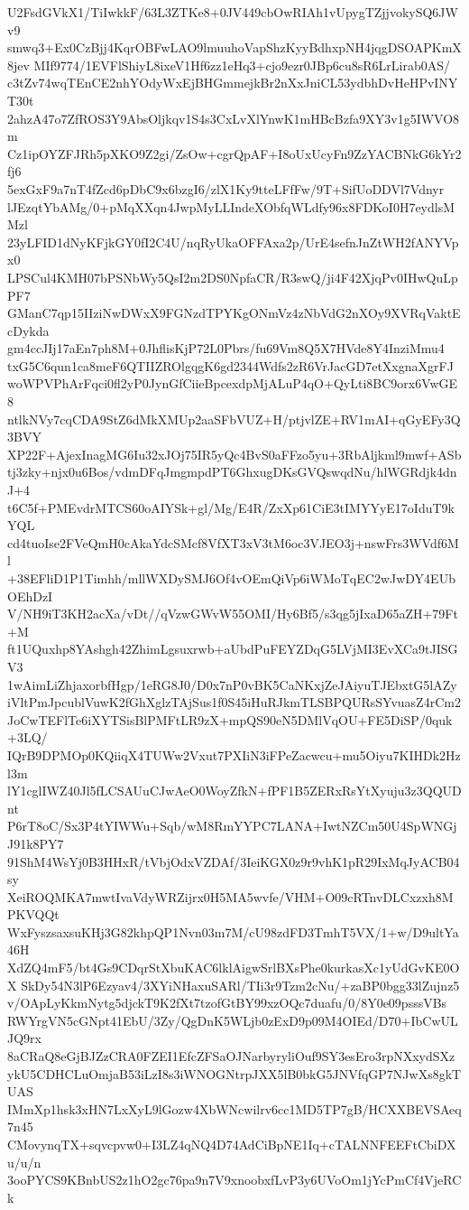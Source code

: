 U2FsdGVkX1/TiIwkkF/63L3ZTKe8+0JV449cbOwRIAh1vUpygTZjjvokySQ6JWv9
smwq3+Ex0CzBjj4KqrOBFwLAO9lmuuhoVapShzKyyBdhxpNH4jqgDSOAPKmX8jev
MIf9774/1EVFlShiyL8ixeV1Hf6zz1eHq3+cjo9ezr0JBp6cu8sR6LrLirab0AS/
c3tZv74wqTEnCE2nhYOdyWxEjBHGmmejkBr2nXxJniCL53ydbhDvHeHPvINYT30t
2ahzA47o7ZfROS3Y9AbsOljkqv1S4s3CxLvXlYnwK1mHBcBzfa9XY3v1g5IWVO8m
Cz1ipOYZFJRh5pXKO9Z2gi/ZsOw+cgrQpAF+I8oUxUcyFn9ZzYACBNkG6kYr2fj6
5exGxF9a7nT4fZcd6pDbC9x6bzgI6/zlX1Ky9tteLFfFw/9T+SifUoDDVl7Vdnyr
lJEzqtYbAMg/0+pMqXXqn4JwpMyLLIndeXObfqWLdfy96x8FDKoI0H7eydlsMMzl
23yLFID1dNyKFjkGY0fI2C4U/nqRyUkaOFFAxa2p/UrE4sefnJnZtWH2fANYVpx0
LPSCul4KMH07bPSNbWy5QsI2m2DS0NpfaCR/R3swQ/ji4F42XjqPv0IHwQuLpPF7
GManC7qp15IIziNwDWxX9FGNzdTPYKgONmVz4zNbVdG2nXOy9XVRqVaktEcDykda
gm4ccJIj17aEn7ph8M+0JhflisKjP72L0Pbrs/fu69Vm8Q5X7HVde8Y4InziMmu4
txG5C6qun1ca8meF6QTIIZROlgqgK6gd2344Wdfs2zR6VrJacGD7etXxgnaXgrFJ
woWPVPhArFqci0fl2yP0JynGfCiieBpcexdpMjALuP4qO+QyLti8BC9orx6VwGE8
ntlkNVy7cqCDA9StZ6dMkXMUp2aaSFbVUZ+H/ptjvlZE+RV1mAI+qGyEFy3Q3BVY
XP22F+AjexInagMG6Iu32xJOj75IR5yQc4BvS0aFFzo5yu+3RbAljkml9mwf+ASb
tj3zky+njx0u6Bos/vdmDFqJmgmpdPT6GhxugDKsGVQswqdNu/hlWGRdjk4dnJ+4
t6C5f+PMEvdrMTCS60oAIYSk+gl/Mg/E4R/ZxXp61CiE3tIMYYyE17oIduT9kYQL
cd4tuoIse2FVeQmH0cAkaYdcSMcf8VfXT3xV3tM6oc3VJEO3j+nswFrs3WVdf6Ml
+38EFliD1P1Timhh/mllWXDySMJ6Of4vOEmQiVp6iWMoTqEC2wJwDY4EUbOEhDzI
V/NH9iT3KH2acXa/vDt//qVzwGWvW55OMI/Hy6Bf5/s3qg5jIxaD65aZH+79Ft+M
ft1UQuxhp8YAshgh42ZhimLgsuxrwb+aUbdPuFEYZDqG5LVjMI3EvXCa9tJISGV3
1wAimLiZhjaxorbfHgp/1eRG8J0/D0x7nP0vBK5CaNKxjZeJAiyuTJEbxtG5lAZy
iVltPmJpcublVuwK2fGhXglzTAjSus1f0S45iHuRJkmTLSBPQURsSYvuasZ4rCm2
JoCwTEFlTe6iXYTSisBlPMFtLR9zX+mpQS90eN5DMlVqOU+FE5DiSP/0quk+3LQ/
IQrB9DPMOp0KQiiqX4TUWw2Vxut7PXIiN3iFPeZacwcu+mu5Oiyu7KIHDk2Hzl3m
lY1cglIWZ40Jl5fLCSAUuCJwAeO0WoyZfkN+fPF1B5ZERxRsYtXyuju3z3QQUDnt
P6rT8oC/Sx3P4tYIWWu+Sqb/wM8RmYYPC7LANA+IwtNZCm50U4SpWNGjJ91k8PY7
91ShM4WsYj0B3HHxR/tVbjOdxVZDAf/3IeiKGX0z9r9vhK1pR29IxMqJyACB04sy
XeiROQMKA7mwtIvaVdyWRZijrx0H5MA5wvfe/VHM+O09cRTnvDLCxzxh8MPKVQQt
WxFyszsaxsuKHj3G82khpQP1Nvn03m7M/cU98zdFD3TmhT5VX/1+w/D9ultYa46H
XdZQ4mF5/bt4Gs9CDqrStXbuKAC6lklAigwSrlBXsPhe0kurkasXc1yUdGvKE0OX
SkDy54N3lP6Ezyav4/3XYiNHaxuSARl/TIi3r9Tzm2cNu/+zaBP0bgg33lZujnz5
v/OApLyKkmNytg5djckT9K2fXt7tzofGtBY99xzOQc7duafu/0/8Y0e09psssVBs
RWYrgVN5cGNpt41EbU/3Zy/QgDnK5WLjb0zExD9p09M4OIEd/D70+IbCwULJQ9rx
8aCRaQ8eGjBJZzCRA0FZEI1EfcZFSaOJNarbyryliOuf9SY3esEro3rpNXxydSXz
ykU5CDHCLuOmjaB53iLzI8s3iWNOGNtrpJXX5lB0bkG5JNVfqGP7NJwXs8gkTUAS
IMmXp1hsk3xHN7LxXyL9lGozw4XbWNcwilrv6cc1MD5TP7gB/HCXXBEVSAeq7n45
CMovynqTX+sqvcpvw0+I3LZ4qNQ4D74AdCiBpNE1Iq+cTALNNFEEFtCbiDXu/u/n
3ooPYCS9KBnbUS2z1hO2gc76pa9n7V9xnoobxfLvP3y6UVoOm1jYcPmCf4VjeRCk
